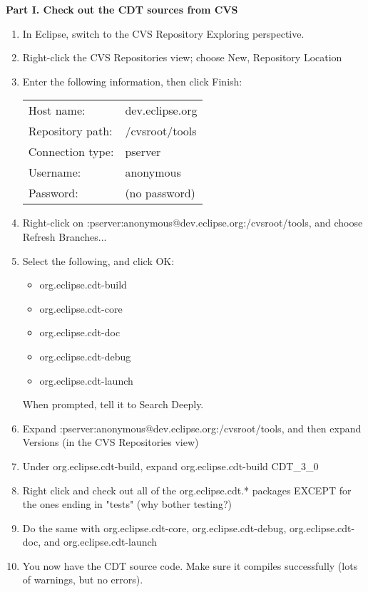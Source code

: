 
\hspace{1em}\textbf{Part I.  Check out the CDT sources from CVS}

\begin{enumerate}
\item  In Eclipse, switch to the CVS Repository Exploring perspective.
\item  Right-click the CVS Repositories view; choose New, Repository Location
\item  Enter the following information, then click Finish: \\
\begin{tabular}{ll}
         Host name:       & dev.eclipse.org \\
         Repository path: & /cvsroot/tools \\
         Connection type: & pserver \\
         Username:        & anonymous \\
         Password:        & (no password) \\
\end{tabular}
\item  Right-click on :pserver:anonymous@dev.eclipse.org:/cvsroot/tools, and choose
    Refresh Branches...
\item  Select the following, and click OK:
\begin{itemize}
    \item     org.eclipse.cdt-build
    \item     org.eclipse.cdt-core
    \item     org.eclipse.cdt-doc
    \item     org.eclipse.cdt-debug
    \item     org.eclipse.cdt-launch
\end{itemize}
    When prompted, tell it to Search Deeply.
\item  Expand :pserver:anonymous@dev.eclipse.org:/cvsroot/tools,
    and then expand Versions (in the CVS Repositories view)
\item  Under org.eclipse.cdt-build, expand org.eclipse.cdt-build CDT\_3\_0
\item  Right click and check out all of the org.eclipse.cdt.* packages
    EXCEPT for the ones ending in "tests" (why bother testing?)
\item  Do the same with org.eclipse.cdt-core, org.eclipse.cdt-debug,
    org.eclipse.cdt-doc, and org.eclipse.cdt-launch
\item You now have the CDT source code.  Make sure it compiles successfully
    (lots of warnings, but no errors).


\end{enumerate}
